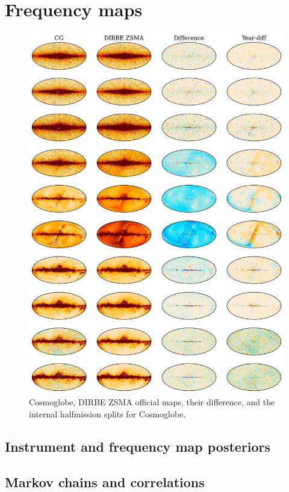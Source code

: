 \documentclass{aa}
\begin{document}
\section{Frequency maps}
\begin{figure}
	\centering
	\includegraphics[width=\linewidth]{figs/diff_grid.png}
	\caption{Cosmoglobe, DIRBE ZSMA official maps, their difference, and the internal halfmission splits for Cosmoglobe.}
	\label{fig:diff_grid}
\end{figure}

\subsection{Instrument and frequency map posteriors}

\subsection{Markov chains and correlations}
\end{document}
